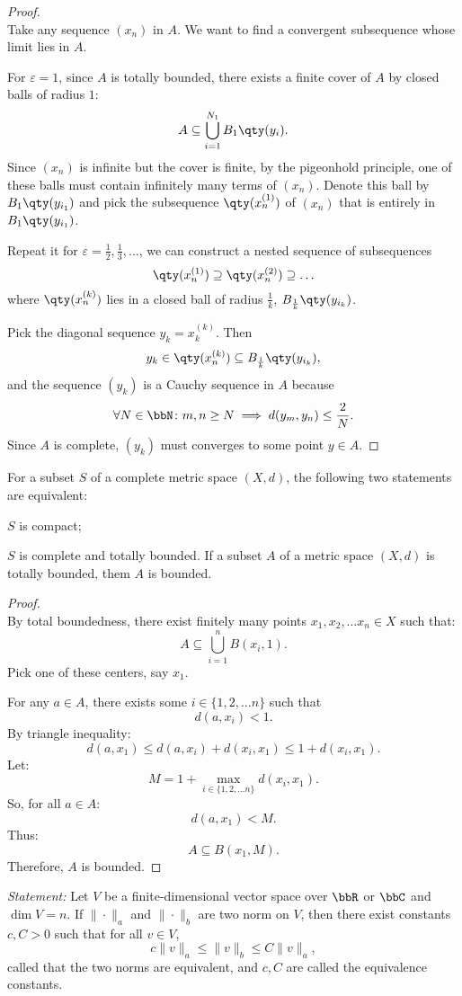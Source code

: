 \documentclass[a4paper,12pt]{article}
\begin{document}
\begin{proof}\mbox{}\\
Take any sequence $(x_n)$ in $A$. We want to find a convergent subsequence whose limit lies in $A$.

For $\varepsilon=1$, since $A$ is totally bounded, there exists a finite cover of $A$ by closed balls of radius $1$:
    \[A\subseteq\bigcup_{i=1}^{N_1}B_1\qty(y_i).\]
    Since $(x_n)$ is infinite but the cover is finite, by the pigeonhold principle, one of these balls must contain infinitely many terms of $(x_n)$. Denote this ball by $B_1\qty(y_{i_1})$ and pick the subsequence $\qty(x_n^{(1)})$ of $(x_n)$ that is entirely in $B_1\qty(y_{i_1})$.

    Repeat it for $\varepsilon=\frac{1}{2},\frac{1}{3},\ldots$, we can construct a nested sequence of subsequences
    \[\qty(x_n^{(1)})\supseteq \qty(x_n^{(2)})\supseteq\ldots\]
    where $\qty(x_n^{(k)})$ lies in a closed ball of radius $\frac{1}{k}$, $B_{\frac{1}{k}}\qty(y_{i_k})$.

    Pick the diagonal sequence $y_k=x_k^{(k)}$. Then
    \[y_k\in\qty(x_n^{(k)})\subseteq B_{\frac{1}{k}}\qty(y_{i_k}),\]
    and the sequence $(y_k)$ is a Cauchy sequence in $A$ because
    \[\forall N\in\bbN\colon m,n\geq N\implies d(y_m,y_n)\leq\frac{2}{N}.\]
    Since $A$ is complete, $(y_k)$ must converges to some point $y\in A$.
\end{proof}
For a subset $S$ of a complete metric space $(X,d)$, the following two statements are equivalent:
\bit
\item $S$ is compact;
\item $S$ is complete and totally bounded.
\eit
{}
 If a subset $A$ of a metric space $(X,d)$ is totally bounded, them $A$ is bounded.

\begin{proof}\mbox{}\\
By total boundedness, there exist finitely many points $x_1,x_2,\ldots x_n\in X$ such that:
\[A\subseteq\bigcup_{i=1}^nB(x_i,1).\]
Pick one of these centers, say $x_1$.

For any $a\in A$, there exists some $i\in\{1,2,\ldots n\}$ such that
\[d(a,x_i)<1.\]
By triangle inequality:
\[d(a,x_1)\leq d(a,x_i)+d(x_i,x_1)\leq 1+d(x_i,x_1).\]
Let:
\[M=1+\max_{i\in\{1,2,\ldots n\}}d(x_i,x_1).\]
So, for all $a\in A$:
\[d(a,x_1)<M.\]
Thus:
\[A\subseteq B(x_1,M).\]
Therefore, $A$ is bounded.
\end{proof}
\textit{Statement: }Let $V$ be a finite-dimensional vector space over $\bbR$ or $\bbC$ and $\dim V=n$. If $\|\cdot\|_a
$ and $\|\cdot\|_b$ are two norm on $V$, then there exist constants $c,C>0$ such that for all $v\in V$,
\[c\|v\|_a\leq\|v\|_b\leq C\|v\|_a,\]
called that the two norms are equivalent, and $c,C$ are called the equivalence constants.
\end{document}
